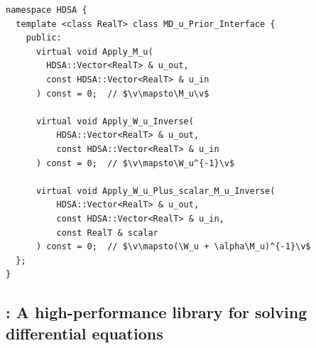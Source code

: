 \begin{listing}[t]
\begin{verbatim}
namespace HDSA {
  template <class RealT> class MD_u_Prior_Interface {
    public:
      virtual void Apply_M_u(
        HDSA::Vector<RealT> & u_out,
        const HDSA::Vector<RealT> & u_in
      ) const = 0;  // $\v\mapsto\M_u\v$

      virtual void Apply_W_u_Inverse(
          HDSA::Vector<RealT> & u_out,
          const HDSA::Vector<RealT> & u_in
      ) const = 0;  // $\v\mapsto\W_u^{-1}\v$

      virtual void Apply_W_u_Plus_scalar_M_u_Inverse(
          HDSA::Vector<RealT> & u_out,
          const HDSA::Vector<RealT> & u_in,
          const RealT & scalar
      ) const = 0;  // $\v\mapsto(\W_u + \alpha\M_u)^{-1}\v$
  };
}
\end{verbatim}
\caption{Outline of the \cpp class for the state prior distribution in \HdsaLib. Compare with~.}
\label{code:hdsalib-hdsa}
\end{listing}




\subsection{\MrHyDE: A high-performance \cpp library for solving differential equations}
\label{sec:mrhyde}

